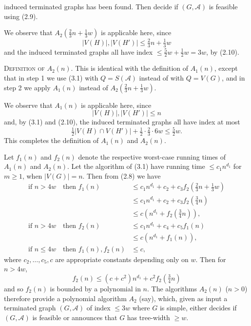 \noindent induced terminated graphs has been found. Then decide if $(G, \mathscr{A})$ is feasible using (2.9).

We observe that $A_2(\tfrac{2}{3}n + \tfrac{1}{3}w)$ is applicable here, since
\begin{equation*}
|V(H)|, |V(H')| \le \tfrac{2}{3}n + \tfrac{1}{3}w
\end{equation*}
and the induced terminated graphs all have index $\le \tfrac{5}{2}w + \tfrac{1}{2}w = 3w$, by (2.10).

\textsc{Definition of} $A_2(n)$. This is identical with the definition of $A_1(n)$, except that in step 1 we use (3.1) with $Q = S(\mathscr{A})$ instead of with $Q = V(G)$, and in step 2 we apply $A_1(n)$ instead of $A_2(\tfrac{2}{3}n + \tfrac{1}{3}w)$.

We observe that $A_1(n)$ is applicable here, since
\begin{equation*}
|V(H)|, |V(H')| \le n
\end{equation*}
and, by (3.1) and (2.10), the induced terminated graphs all have index at most
\begin{equation*}
\tfrac{1}{2}|V(H) \cap V(H')| + \tfrac{1}{2} \cdot \tfrac{2}{3} \cdot 6w \le \tfrac{5}{2}w.
\end{equation*}
This completes the definition of $A_1(n)$ and $A_2(n)$.

Let $f_1(n)$ and $f_2(n)$ denote the respective worst-case running times of $A_1(n)$ and $A_2(n)$. Let the algorithm of (3.1) have running time $\le c_1 n^{d_1}$ for $m \ge 1$, when $|V(G)| = n$. Then from (2.8) we have
\begin{align*}
\text{if } n > 4w \quad \text{then } f_1(n) &\le c_1 n^{d_1} + c_2 + c_3 f_2(\tfrac{2}{3}n + \tfrac{1}{3}w) \\
&\le c_1 n^{d_1} + c_2 + c_3 f_2(\tfrac{3}{4}n) \\
&\le c(n^{d_1} + f_2(\tfrac{3}{4}n)), \\
\text{if } n > 4w \quad \text{then } f_2(n) &\le c_1 n^{d_1} + c_4 + c_5 f_1(n) \\
&\le c(n^{d_1} + f_1(n)), \\
\text{if } n \le 4w \quad \text{then } f_1(n), f_2(n) &\le c,
\end{align*}
where $c_2, \dots, c_5, c$ are appropriate constants depending only on $w$. Then for $n > 4w$,
\begin{equation*}
f_2(n) \le (c + c^2)n^{d_1} + c^2 f_2(\tfrac{3}{4}n)
\end{equation*}
and so $f_2(n)$ is bounded by a polynomial in $n$. The algorithms $A_2(n)$ ($n > 0$) therefore provide a polynomial algorithm $A_2$ (say), which, given as input a terminated graph $(G, \mathscr{A})$ of index $\le 3w$ where $G$ is simple, either decides if $(G, \mathscr{A})$ is feasible or announces that $G$ has tree-width $\ge w$.
